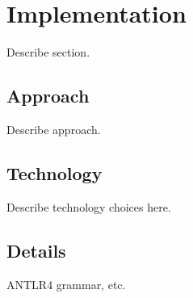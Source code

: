\documentclass[12pt,oneside,a4paper,notitlepage]{report}
\begin{document}
	\section*{Implementation}
	\par Describe section.

	\subsection*{Approach}
	\par Describe approach.

	\subsection*{Technology}
	\par Describe technology choices here.

	\subsection*{Details}
	\par ANTLR4 grammar,  etc.

	\printbibliography[
		title=Sources
	]
\end{document}
